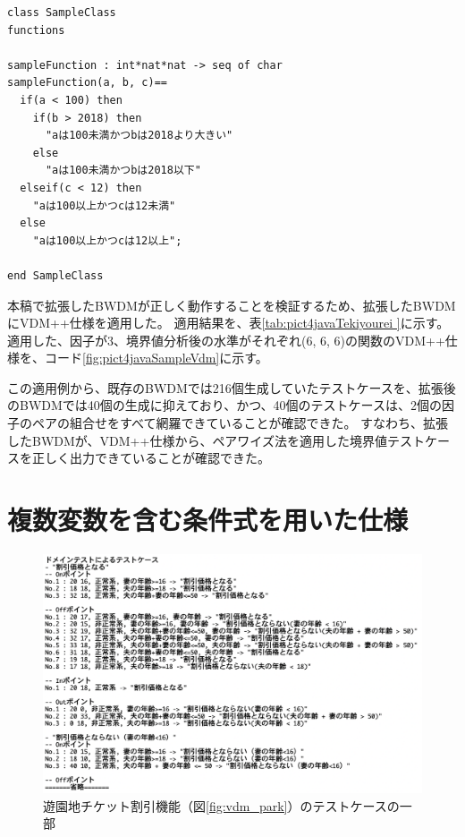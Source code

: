 \documentclass[uplatex, report, a4j, 10pt]{jsbook}
\begin{document}
\lstset{language=}
\noindent\begin{minipage}{\textwidth}
  \begin{lstlisting}[caption=因子が3、水準が（6 6 6）の関数を持つVDM++仕様。,label=fig:pict4javaSampleVdm]
class SampleClass
functions

sampleFunction : int*nat*nat -> seq of char
sampleFunction(a, b, c)==
  if(a < 100) then
    if(b > 2018) then
      "aは100未満かつbは2018より大きい"
    else
      "aは100未満かつbは2018以下"
  elseif(c < 12) then
    "aは100以上かつcは12未満"
  else
    "aは100以上かつcは12以上";

end SampleClass
\end{lstlisting}
\end{minipage}

本稿で拡張したBWDMが正しく動作することを検証するため、拡張したBWDMにVDM++仕様を適用した。
適用結果を、表\ref{tab:pict4javaTekiyourei }に示す。
適用した、因子が3、境界値分析後の水準がそれぞれ(6, 6, 6)の関数のVDM++仕様を、コード\ref{fig:pict4javaSampleVdm}に示す。

この適用例から、既存のBWDMでは216個生成していたテストケースを、拡張後のBWDMでは40個の生成に抑えており、かつ、40個のテストケースは、2個の因子のペアの組合せをすべて網羅できていることが確認できた。
すなわち、拡張したBWDMが、VDM++仕様から、ペアワイズ法を適用した境界値テストケースを正しく出力できていることが確認できた。


\section{複数変数を含む条件式を用いた仕様}
\begin{figure}[tp]
  \centering
  \includegraphics[keepaspectratio, width=160mm]{figs/tekiyourei}
  \caption{遊園地チケット割引機能（図\ref{fig:vdm_park}）のテストケースの一部}
  \label{fig:park_testcase}
\end{figure}
\end{document}

